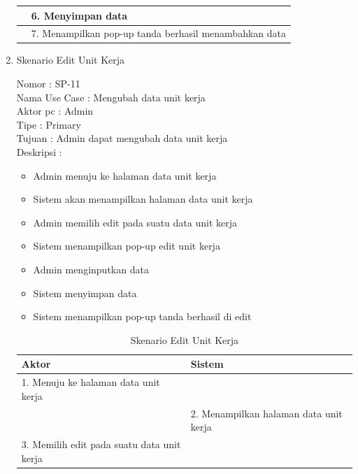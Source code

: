 \begin{enumerate}
\begin{table}
\begin{tabular}{ | l | p{65mm} |}
		& 6.	Menyimpan data \\
		\hline
		
		& 7.	Menampilkan pop-up tanda berhasil menambahkan data \\
		\hline
		
	\end{tabular}
\end{table}

\item Skenario Edit Unit Kerja

Nomor \kern 3.6pc : SP-11 \\
Nama Use Case : Mengubah data unit kerja \\
Aktor  pc : Admin \\
Tipe \kern 4.6pc : Primary \\
Tujuan \kern 3.6pc : Admin dapat mengubah data unit kerja \\
Deskripsi \kern 2.5pc : 

\begin{itemize}
	\item Admin menuju ke halaman data unit kerja
	\item Sistem akan menampilkan halaman data unit kerja
	\item Admin memilih edit pada suatu data unit kerja
	\item Sistem menampilkan pop-up edit unit kerja
	\item Admin menginputkan data
	\item Sistem menyimpan data
	\item Sistem menampilkan pop-up tanda berhasil di edit
	
\end{itemize}

\begin{table}
	\caption{Skenario Edit Unit Kerja}
	\centering
	\begin{tabular}{ | p{55mm} | p{70mm} |}
		\hline 
		\textbf{Aktor} & \textbf{Sistem} \\
		\hline
		
		1.	Menuju ke halaman data unit kerja &  \\
		
		\hline
		
		&  2.	Menampilkan halaman data unit kerja \\
		
		\hline
		
		3. Memilih edit pada suatu data unit kerja & \\
		

\end{tabular}
\end{table}
\end{enumerate}
